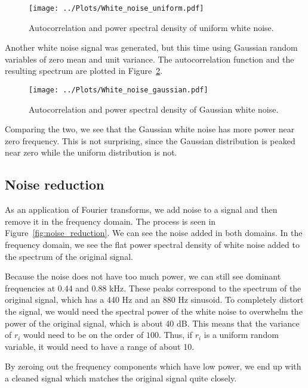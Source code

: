 \documentclass[twocolumn]{myarticle}
\begin{document}
\begin{figure}[htb]
    \centering
    \texttt{[image: ../Plots/White\_noise\_uniform.pdf]}
    \caption{Autocorrelation and power spectral density of uniform white noise.}
    \label{fig:white_noise_uniform}
\end{figure}

Another white noise signal was generated, but this time using Gaussian random variables of zero mean and unit variance.
The autocorrelation function and the resulting spectrum are plotted in Figure~\ref{fig:white_noise_gaussian}.

\begin{figure}[htb]
    \centering
    \texttt{[image: ../Plots/White\_noise\_gaussian.pdf]}
    \caption{Autocorrelation and power spectral density of Gaussian white noise.}
    \label{fig:white_noise_gaussian}
\end{figure}

Comparing the two, we see that the Gaussian white noise has more power near zero frequency.
This is not surprising, since the Gaussian distribution is peaked near zero while the uniform distribution is not.

\subsection{Noise reduction}
\label{subsec:noise_reduction}

As an application of Fourier transforms, we add noise to a signal and then remove it in the frequency domain.
The process is seen in Figure~\ref{fig:noise_reduction}.
We can see the noise added in both domains.
In the frequency domain, we see the flat power spectral density of white noise added to the spectrum of the original signal.

Because the noise does not have too much power, we can still see dominant frequencies at 0.44 and 0.88 kHz.
These peaks correspond to the spectrum of the original signal, which has a 440 Hz and an 880 Hz sinusoid.
To completely distort the signal, we would need the spectral power of the white noise to overwhelm the power of the original signal, which is about 40 dB.
This means that the variance of $ r_i $ would need to be on the order of $ 100 $.
Thus, if $ r_i $ is a uniform random variable, it would need to have a range of about 10.

By zeroing out the frequency components which have low power, we end up with a cleaned signal which matches the original signal quite closely.
\end{document}

